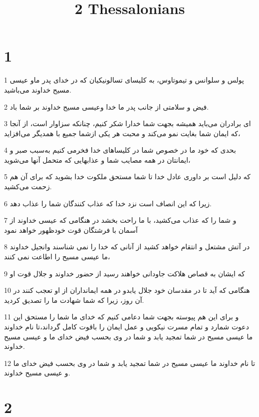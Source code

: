 

\title{2 Thessalonians}


\chapter{1}

\par 1 پولس و سلوانس و تیموتاوس، به کلیسای تسالونیکیان که در خدای پدر ماو عیسی مسیح خداوند می‌باشید.
\par 2 فیض و سلامتی از جانب پدر ما خدا وعیسی مسیح خداوند بر شما باد.
\par 3 ‌ای برادران می‌باید همیشه بجهت شما خدارا شکر کنیم، چنانکه سزاوار است، از آنجا که ایمان شما بغایت نمو می‌کند و محبت هر یکی ازشما جمیع با همدیگر می‌افزاید،
\par 4 بحدی که خود ما در خصوص شما در کلیساهای خدا فخرمی کنیم به‌سبب صبر و ایمانتان در همه مصایب شما و عذابهایی که متحمل آنها می‌شوید،
\par 5 که دلیل است بر داوری عادل خدا تا شما مستحق ملکوت خدا بشوید که برای آن هم زحمت می‌کشید.
\par 6 زیرا که این انصاف است نزد خدا که عذاب کنندگان شما را عذاب دهد.
\par 7 و شما را که عذاب می‌کشید، با ما راحت بخشد در هنگامی که عیسی خداوند از آسمان با فرشتگان قوت خودظهور خواهد نمود
\par 8 در آتش مشتعل و انتقام خواهد کشید از آنانی که خدا را نمی شناسند وانجیل خداوند ما عیسی مسیح را اطاعت نمی کنند،
\par 9 که ایشان به قصاص هلاکت جاودانی خواهند رسید از حضور خداوند و جلال قوت او
\par 10 هنگامی که آید تا در مقدسان خود جلال یابدو در همه ایمانداران از او تعجب کنند در آن روز، زیرا که شما شهادت ما را تصدیق کردید.
\par 11 و برای این هم پیوسته بجهت شما دعامی کنیم که خدای ما شما را مستحق این دعوت شمارد و تمام مسرت نیکویی و عمل ایمان را باقوت کامل گرداند،تا نام خداوند ما عیسی مسیح در شما تمجید یابد و شما در وی بحسب فیض خدای ما و عیسی مسیح خداوند.
\par 12 تا نام خداوند ما عیسی مسیح در شما تمجید یابد و شما در وی بحسب فیض خدای ما و عیسی مسیح خداوند.

\chapter{2}

